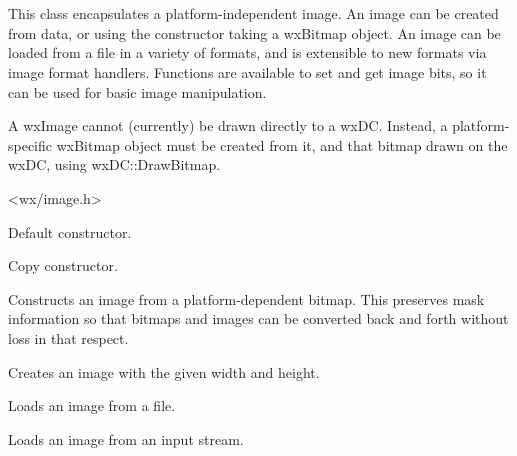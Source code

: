\section{}\label{wximage}

This class encapsulates a platform-independent image. An image can be created
from data, or using the constructor taking a wxBitmap object. An image
can be loaded from a file in a variety of formats, and is extensible to new formats
via image format handlers. Functions are available to set and get image bits, so
it can be used for basic image manipulation.

A wxImage cannot (currently) be drawn directly to a wxDC. Instead, a platform-specific
wxBitmap object must be created from it, and that bitmap drawn on the wxDC, using
wxDC::DrawBitmap.




<wx/image.h>




\label{wximageconstr}


Default constructor.


Copy constructor.


Constructs an image from a platform-dependent bitmap. This preserves
mask information so that bitmaps and images can be converted back
and forth without loss in that respect.


Creates an image with the given width and height.


Loads an image from a file.


Loads an image from an input stream.

